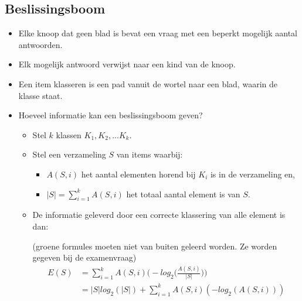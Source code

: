 \subsection{Beslissingsboom}
	\begin{itemize}
		\item Elke knoop dat geen blad is bevat een vraag met een beperkt mogelijk aantal antwoorden.
		\item Elk mogelijk antwoord verwijst naar een kind van de knoop.
		\item Een item klasseren is een pad vanuit de wortel naar een blad, waarin de klasse staat.
		\item Hoeveel informatie kan een beslissingsboom geven?
		\begin{itemize}
			\item Stel $k$ klassen $K_1, K_2, ... K_k$.
			\item Stel een verzameling $S$ van items waarbij:
			\begin{itemize}
				\item $A(S, i)$ het aantal elementen horend bij $K_i$ is in de verzameling en,
				\item $|S| = \sum_{i = 1}^k A(S,i)$ het totaal aantal element is van $S$.
			\end{itemize} 
			\item De informatie geleverd door een correcte klassering van alle element is dan:
			
			 {\color{OliveGreen}(groene formules moeten niet van buiten geleerd worden. Ze worden gegeven bij de examenvraag)}
			{\color{OliveGreen}
			\begin{equation*}
				\begin{split}
					E(S) & = \sum_{i = 1}^{k} A(S, i) \bigg(-log_2 \bigg( \frac{A(S, i)}{|S|}\bigg) \bigg) \\
					     & = |S|log_2(|S|) +  \sum_{i = 1}^{k} A(S, i)(-log_2(A(S, i)))
				\end{split}
			\end{equation*}
		}
		\end{itemize}
		\end{itemize}
